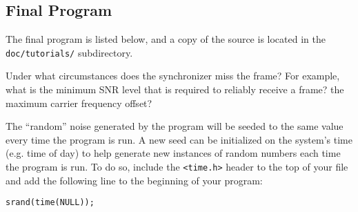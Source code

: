 %
%
\subsection{Final Program}
\label{tutorial:framing:completed}

The final program is listed below,
and a copy of the source is located in the {\tt doc/tutorials/}
subdirectory.
%

%


Under what circumstances does the synchronizer miss the frame?
For example, what is the minimum SNR level that is required to reliably
receive a frame?
the maximum carrier frequency offset?

The ``random'' noise generated by the program will be seeded to the same
value every time the program is run.
A new seed can be initialized on the system's time (e.g. time of day) to
help generate new instances of random numbers each time the program is
run.
To do so, include the {\tt <time.h>} header to the top of your file and
add the following line to the beginning of your program:
%
\begin{Verbatim}[fontsize=\small]
    srand(time(NULL));
\end{Verbatim}
%

